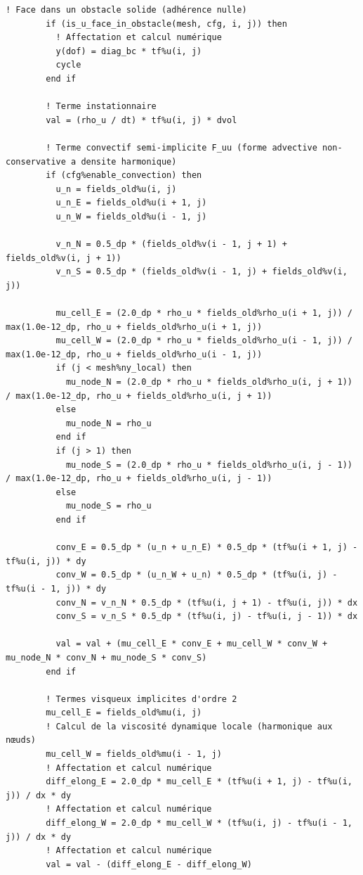 \documentclass[10pt,a4paper,oneside]{book}
\begin{document}
\begin{lstlisting}[language={[95]Fortran}]
        ! Face dans un obstacle solide (adhérence nulle)
        if (is_u_face_in_obstacle(mesh, cfg, i, j)) then
          ! Affectation et calcul numérique
          y(dof) = diag_bc * tf%u(i, j)
          cycle
        end if

        ! Terme instationnaire
        val = (rho_u / dt) * tf%u(i, j) * dvol

        ! Terme convectif semi-implicite F_uu (forme advective non-conservative a densite harmonique)
        if (cfg%enable_convection) then
          u_n = fields_old%u(i, j)
          u_n_E = fields_old%u(i + 1, j)
          u_n_W = fields_old%u(i - 1, j)

          v_n_N = 0.5_dp * (fields_old%v(i - 1, j + 1) + fields_old%v(i, j + 1))
          v_n_S = 0.5_dp * (fields_old%v(i - 1, j) + fields_old%v(i, j))

          mu_cell_E = (2.0_dp * rho_u * fields_old%rho_u(i + 1, j)) / max(1.0e-12_dp, rho_u + fields_old%rho_u(i + 1, j))
          mu_cell_W = (2.0_dp * rho_u * fields_old%rho_u(i - 1, j)) / max(1.0e-12_dp, rho_u + fields_old%rho_u(i - 1, j))
          if (j < mesh%ny_local) then
            mu_node_N = (2.0_dp * rho_u * fields_old%rho_u(i, j + 1)) / max(1.0e-12_dp, rho_u + fields_old%rho_u(i, j + 1))
          else
            mu_node_N = rho_u
          end if
          if (j > 1) then
            mu_node_S = (2.0_dp * rho_u * fields_old%rho_u(i, j - 1)) / max(1.0e-12_dp, rho_u + fields_old%rho_u(i, j - 1))
          else
            mu_node_S = rho_u
          end if

          conv_E = 0.5_dp * (u_n + u_n_E) * 0.5_dp * (tf%u(i + 1, j) - tf%u(i, j)) * dy
          conv_W = 0.5_dp * (u_n_W + u_n) * 0.5_dp * (tf%u(i, j) - tf%u(i - 1, j)) * dy
          conv_N = v_n_N * 0.5_dp * (tf%u(i, j + 1) - tf%u(i, j)) * dx
          conv_S = v_n_S * 0.5_dp * (tf%u(i, j) - tf%u(i, j - 1)) * dx

          val = val + (mu_cell_E * conv_E + mu_cell_W * conv_W + mu_node_N * conv_N + mu_node_S * conv_S)
        end if

        ! Termes visqueux implicites d'ordre 2
        mu_cell_E = fields_old%mu(i, j)
        ! Calcul de la viscosité dynamique locale (harmonique aux nœuds)
        mu_cell_W = fields_old%mu(i - 1, j)
        ! Affectation et calcul numérique
        diff_elong_E = 2.0_dp * mu_cell_E * (tf%u(i + 1, j) - tf%u(i, j)) / dx * dy
        ! Affectation et calcul numérique
        diff_elong_W = 2.0_dp * mu_cell_W * (tf%u(i, j) - tf%u(i - 1, j)) / dx * dy
        ! Affectation et calcul numérique
        val = val - (diff_elong_E - diff_elong_W)


\end{lstlisting}
\end{document}
